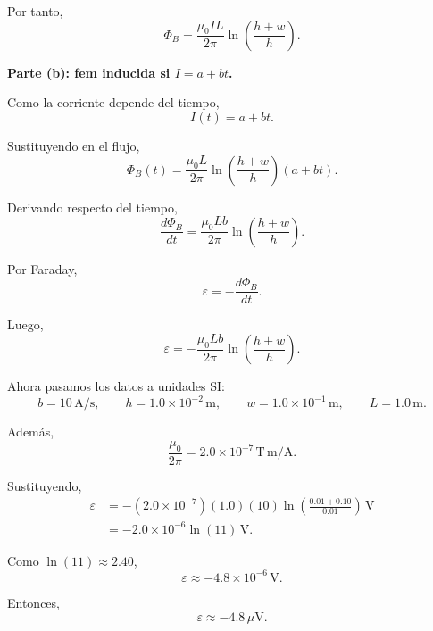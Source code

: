 \documentclass[11pt]{article}
\newcommand{\paso}[1]{%
  \par\medskip
  \noindent\textbf{#1}\par
  \vspace{0.1em}%
}
\begin{document}
Por tanto,
\begin{equation*}
    \boxed{\Phi_B=\frac{\mu_0 I L}{2\pi}\ln\left(\frac{h+w}{h}\right).}
\end{equation*}

\paso{Parte (b): fem inducida si $I=a+bt$.}
Como la corriente depende del tiempo,
\begin{equation*}
    I(t)=a+bt.
\end{equation*}

Sustituyendo en el flujo,
\begin{equation*}
    \Phi_B(t)=\frac{\mu_0 L}{2\pi}\ln\left(\frac{h+w}{h}\right)(a+bt).
\end{equation*}

Derivando respecto del tiempo,
\begin{equation*}
    \frac{d\Phi_B}{dt}=\frac{\mu_0 Lb}{2\pi}\ln\left(\frac{h+w}{h}\right).
\end{equation*}

Por Faraday,
\begin{equation*}
    \varepsilon=-\frac{d\Phi_B}{dt}.
\end{equation*}

Luego,
\begin{equation*}
    \boxed{\varepsilon=-\frac{\mu_0 Lb}{2\pi}\ln\left(\frac{h+w}{h}\right).}
\end{equation*}

Ahora pasamos los datos a unidades SI:
\begin{equation*}
    b=10\,\mathrm{A/s},\qquad
    h=1.0\times10^{-2}\,\mathrm{m},\qquad
    w=1.0\times10^{-1}\,\mathrm{m},\qquad
    L=1.0\,\mathrm{m}.
\end{equation*}

Adem\'as,
\begin{equation*}
    \frac{\mu_0}{2\pi}=2.0\times10^{-7}\,\mathrm{T\,m/A}.
\end{equation*}

Sustituyendo,
\begin{align*}
    \varepsilon
    &=-(2.0\times10^{-7})(1.0)(10)
    \ln\left(\frac{0.01+0.10}{0.01}\right)\,\mathrm{V} \\
    &=-2.0\times10^{-6}\ln(11)\,\mathrm{V}.
\end{align*}

Como $\ln(11)\approx2.40$,
\begin{equation*}
    \varepsilon\approx -4.8\times10^{-6}\,\mathrm{V}.
\end{equation*}

Entonces,
\begin{equation*}
    \boxed{\varepsilon\approx -4.8\,\mu\mathrm{V}.}
\end{equation*}
\end{document}
